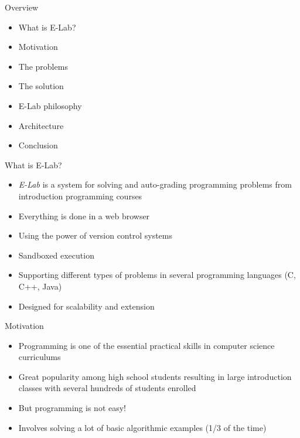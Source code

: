 
\begin{frame}{Overview}
	\begin{itemize}[<+-| alert@+>]
	  \item What is E-Lab?
	  \item Motivation
	  \item The problems
	  \item The solution
	  \item E-Lab philosophy
	  \item Architecture
	  \item Conclusion
	\end{itemize}
\end{frame}


\begin{frame}{What is E-Lab?}
	\begin{itemize}[<+-| alert@+>]
	  \item \emph{E-Lab} is a system for solving and auto-grading programming
	  problems from introduction programming courses
	  \item Everything is done in a web browser
	  \item Using the power of version control systems
	  \item Sandboxed execution
	  \item Supporting different types of problems in several programming languages
	  (C, C++, Java)
	  \item Designed for scalability and extension
	\end{itemize}
\end{frame}

\begin{frame}{Motivation}
	\begin{itemize}[<+-| alert@+>]
	  \item Programming is one of the essential practical skills in computer science curriculums
	  \item Great popularity among high school students resulting in large
	  introduction classes with several hundreds of students enrolled
	  \item But programming is not easy!
	  \item Involves solving a lot of basic algorithmic examples (1/3 of the time)
	\end{itemize}
\end{frame}

